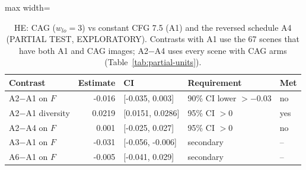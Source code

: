 \begin{table}[t]\centering\small
\caption{HE: CAG ($w_{lo}=3$) vs constant CFG 7.5 (A1) and the reversed schedule A4 (PARTIAL TEST, EXPLORATORY). Contrasts with A1 use the 67 scenes that have both A1 and CAG images; A2$-$A4 uses every scene with CAG arms (Table~\ref{tab:partial-units}).}\label{tab:partial-he}
\begin{adjustbox}{max width=\linewidth}
\begin{tabular}{lrlll}
\toprule
Contrast & Estimate & CI & Requirement & Met \\
\midrule
A2$-$A1 on $F$ & -0.016 & [-0.035, 0.003] & 90\% CI lower $>-0.03$ & no \\
A2$-$A1 diversity & 0.0219 & [0.0151, 0.0286] & 95\% CI $>0$ & yes \\
A2$-$A4 on $F$ & 0.001 & [-0.025, 0.027] & 95\% CI $>0$ & no \\
A3$-$A1 on $F$ & -0.031 & [-0.056, -0.006] & secondary & -- \\
A6$-$A1 on $F$ & -0.005 & [-0.041, 0.029] & secondary & -- \\
\bottomrule
\end{tabular}
\end{adjustbox}
\end{table}
